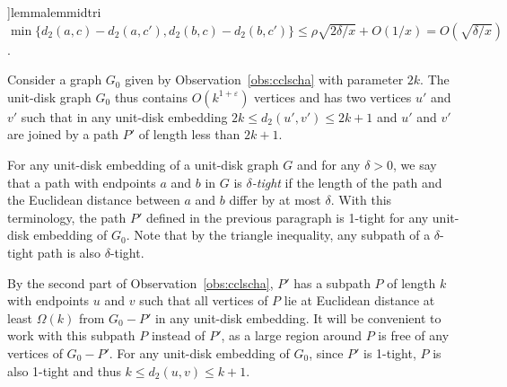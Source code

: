 \documentclass[a4paper,reqno, 12pt]{amsart}
\newcommand{\apx}[1]{\hyperref[#1]{\Rightscissors}}
\begin{document}
  
\begin{restatable}[\apx{sec:prtab}]{lemma}{lemmidtri}
\label{lem:midtri}
  $\min\{d_2(a,c)- d_2(a,c'), d_2(b,c)- d_2(b,c')\}\le 
 \rho \sqrt{2\delta/x}+O(1/x)=O(\sqrt{\delta/x})$.
\end{restatable}


Consider a graph $G_0$ given by Observation~\ref{obs:cclscha} with
parameter $2k$. The
unit-disk graph $G_0$ thus contains $O(k^{1+\varepsilon})$ vertices and has two
vertices $u'$ and $v'$ such that in any unit-disk  embedding
$2k\le d_2(u',v')\le 2k+1$ and $u'$ and $v'$ are joined by a path $P'$ of
length less than $2k+1$. 


\medskip

For any unit-disk embedding of a unit-disk graph $G$ and for any  $\delta>0$, we say that a path with endpoints $a$ and $b$ in $G$ 
is \emph{$\delta$-tight} if the length of the path and the
Euclidean distance between $a$ and $b$ differ by at most
$\delta$. With this terminology, the path $P'$ defined in the previous
paragraph is 1-tight for any unit-disk embedding of $G_0$. Note that by the triangle inequality, any
subpath of a $\delta$-tight path is also $\delta$-tight.

\medskip

By the second part of Observation~\ref{obs:cclscha}, $P'$ has a
subpath $P$ of length $k$ with
endpoints $u$ and $v$ such that all vertices
of $P$ lie at Euclidean distance at least $\Omega(k)$ from $G_0-P'$ in any
unit-disk embedding. It will be convenient to work with this subpath $P$ instead
of $P'$, as a large region around $P$ is free of any vertices of
$G_0-P'$. For any unit-disk embedding of $G_0$, since $P'$ is 1-tight, $P$ is also
1-tight and thus $k\le d_2(u,v)\le k+1$.

\medskip
\end{document}
